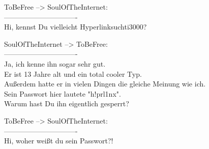 \noindent \parbox{\textwidth}{

    \begin{footnotesize}
    \begin{itshape}
    \begin{flushright}

\noindent ToBeFree --> SoulOfTheInternet:\\
\noindent -------------------------------\\
\noindent Hi, kennst Du vielleicht Hyperlinksuchti3000?\\

    \end{flushright}
    \end{itshape}
    \end{footnotesize}

}


\noindent \parbox{\textwidth}{

    \begin{footnotesize}
    \begin{itshape}

\noindent SoulOfTheInternet --> ToBeFree:\\
\noindent -------------------------------\\
\noindent Ja, ich kenne ihn sogar sehr gut.\\
\noindent Er ist 13 Jahre alt und ein total cooler Typ.\\
\noindent Außerdem hatte er in vielen Dingen die gleiche Meinung wie ich.\\
\noindent Sein Passwort hier lautete "h!prl1nx".\\
\noindent Warum hast Du ihn eigentlich gesperrt?\\

    \end{itshape}
    \end{footnotesize}

}


\noindent \parbox{\textwidth}{

    \begin{footnotesize}
    \begin{itshape}
    \begin{flushright}

\noindent ToBeFree --> SoulOfTheInternet:\\
\noindent -------------------------------\\
\noindent Hi, woher weißt du sein Passwort?!\\

    \end{flushright}
    \end{itshape}
    \end{footnotesize}

}


